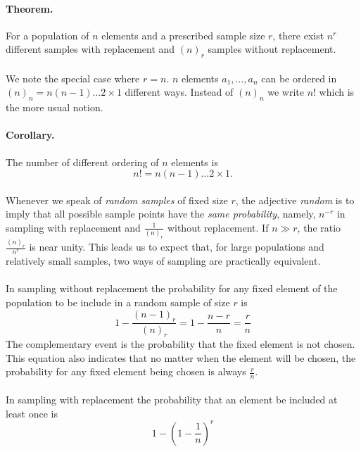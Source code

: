 \documentclass{article}
\numberwithin{equation}{subsection}
\begin{document}
			\paragraph{Theorem. } For a population of $n$ elements and a prescribed sample size $r$, there exist $n^r$ different samples with replacement and $(n)_r$ samples without replacement.			
			\paragraph{} We note the special case where $r=n$. $n$ elements $a_1,\dots,a_n$ can be ordered in $(n)_n = n(n-1)\dots2\times1$ different ways. Instead of $(n)_n$ we write $n!$ which is the more usual notion.
			\paragraph{Corollary. } The number of different ordering of $n$ elements is
			\begin{equation}
				n! = n(n-1)\dots 2\times 1.
			\end{equation}
			\paragraph{} Whenever we speak of \textit{random samples} of fixed size $r$, the adjective \textit{random} is to imply that all possible sample points have the \textit{same probability}, namely, $n^{-r}$ in sampling with replacement and $\frac{1}{(n)_r}$ without replacement. If $n \gg r$, the ratio $\frac{(n)_r}{n^r}$ is near unity. This leads us to expect that, for large populations and relatively small samples, two ways of sampling are practically equivalent.
			\paragraph{} In sampling without replacement the probability for any fixed element of the population to be include in a random sample of size $r$ is
			\begin{equation}
				1-\frac{(n-1)_r}{(n)_r} = 1-\frac{n-r}{n} = \frac{r}{n}
			\end{equation}
			The complementary event is the probability that the fixed element is not chosen. This equation also indicates that no matter when the element will be chosen, the probability for any fixed element being chosen is always $\frac{r}{n}$.
			\paragraph{} In sampling with replacement the probability that an element be included at least once is
			\begin{equation}
				1 - {\left( 1 - \frac{1}{n} \right)}^r
			\end{equation}
\end{document}
